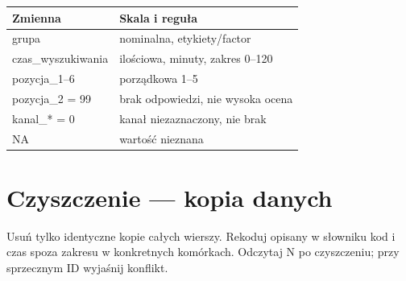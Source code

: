\documentclass[
  polish,
  11pt,
  a4paper,
]{article}
\newenvironment{Shaded}{\begin{snugshade}}{\end{snugshade}}
\newcommand{\ConstantTok}[1]{\textcolor[rgb]{0.56,0.35,0.01}{#1}}
\newcommand{\DecValTok}[1]{\textcolor[rgb]{0.00,0.00,0.81}{#1}}
\newcommand{\FunctionTok}[1]{\textcolor[rgb]{0.13,0.29,0.53}{\textbf{#1}}}
\newcommand{\NormalTok}[1]{#1}
\newcommand{\OtherTok}[1]{\textcolor[rgb]{0.56,0.35,0.01}{#1}}
\newcommand{\SpecialCharTok}[1]{\textcolor[rgb]{0.81,0.36,0.00}{\textbf{#1}}}
\newcounter{none} %
\begin{document}
{\def\LTcaptype{none} %
\begin{longtable}[]{@{}ll@{}}
\toprule\noalign{}
Zmienna & Skala i reguła \\
\midrule\noalign{}
\endhead
\bottomrule\noalign{}
\endlastfoot
grupa & nominalna, etykiety/factor \\
czas\_wyszukiwania & ilościowa, minuty, zakres 0--120 \\
pozycja\_1--6 & porządkowa 1--5 \\
pozycja\_2 = 99 & brak odpowiedzi, nie wysoka ocena \\
kanal\_* = 0 & kanał niezaznaczony, nie brak \\
NA & wartość nieznana \\
\end{longtable}
}

\section{Czyszczenie --- kopia danych}\label{czyszczenie-kopia-danych}

Usuń tylko identyczne kopie całych wierszy. Rekoduj opisany w słowniku
kod i czas spoza zakresu w konkretnych komórkach. Odczytaj N po
czyszczeniu; przy sprzecznym ID wyjaśnij konflikt.

\begin{Shaded}
\end{Shaded}
\end{document}
